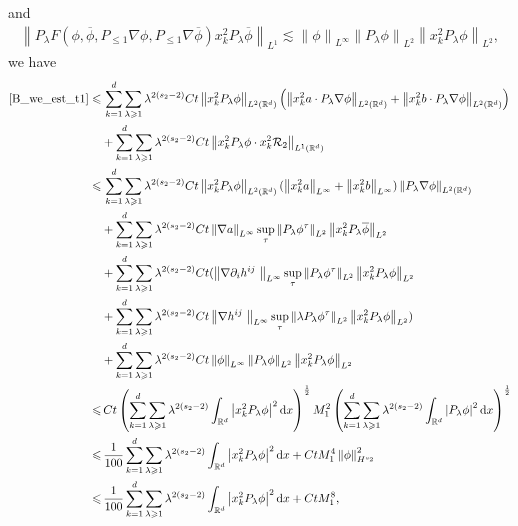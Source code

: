 \documentclass[10pt,twoside,a4paper]{article}
\numberwithin{equation}{section}\allowdisplaybreaks
\def\leq{\leqslant}
\def\geq{\geqslant}
\begin{document}
	and 
	\begin{align*}
		\left\|P_{\lambda}  F(\phi, \overline{\phi}, P_{\leq 1} \nabla \phi,  P_{\leq 1} \nabla \overline{\phi}) x^2_k P_{\lambda} \overline{ \phi } \right\|_{L^1}\lesssim \left\|\phi \right\|_{L^\infty} \left\|P_\lambda  \phi   \right\|_{L^2}
		\left\|x^2_k P_{\lambda} \phi \right\|_{L^2},
	\end{align*}
	we have
	\begin{align*} 
		\eqref{B_we_est_t1} \leq & \, \sum_{k=1}^d\sum_{\lambda\geq 1} \lambda^{2(s_2-2)}  C t    \left\| x_k^2 P_{\lambda}\phi\right\|_{L^{2}(\mathbb{R}^d)}  \left(\left\| x_k^2  a\cdot  P_{\lambda}  \nabla \phi \right\|_{L^{2}(\mathbb{R}^d)} + \left\|x_k^2  b\cdot  P_{\lambda}  \nabla \phi \right\|_{L^{2}(\mathbb{R}^d)}\right) \\
		&+ \sum_{k=1}^d\sum_{\lambda\geq 1} \lambda^{2(s_2-2)} C t\left\|x_k^2 P_{\lambda}\phi \cdot 
		x_k^2  \mathcal{R}_2\right\|_{L^{1}(\mathbb{R}^d)}\\
		\leq &  \, \sum_{k=1}^d\sum_{\lambda\geq 1} \lambda^{2(s_2-2)}  C t    \left\| x_k^2 P_{\lambda}\phi\right\|_{L^{2}(\mathbb{R}^d)} ( \left\| x_k^2 a \right\|_{L^\infty } + \left\| x_k^2 b \right\|_{L^\infty } )\left\| P_{\lambda}  \nabla \phi \right\|_{L^{2}(\mathbb{R}^d)}  \nonumber\\
		&+ \sum_{k=1}^d\sum_{\lambda\geq 1} \lambda^{2(s_2-2)} Ct   \left\|\nabla a\right\|_{L^\infty} \sup_\tau\left\| P_\lambda \phi^{\tau}\right\|_{L^2}  \left\|x^2_k P_{\lambda} \overline{ \phi }  \right\|_{L^2}\\
		&+ \sum_{k=1}^d\sum_{\lambda\geq 1} \lambda^{2(s_2-2)} Ct( \left\|\nabla \partial_ih^{ij}\ \right\|_{L^\infty}  \sup_{\tau} \left\|P_{\lambda}  \phi^\tau \right\|_{L^2} \left\|x^2_k P_{\lambda} \phi \right\|_{L^2}\\
		&+ \sum_{k=1}^d\sum_{\lambda\geq 1} \lambda^{2(s_2-2)} Ct\left\|\nabla  h^{ij}\ \right\|_{L^\infty}  \sup_{\tau} \left\| \lambda P_{\lambda}  \phi^\tau \right\|_{L^2} \left\|x^2_k P_{\lambda} \phi \right\|_{L^2})\\
		&+ \sum_{k=1}^d\sum_{\lambda\geq 1} \lambda^{2(s_2-2)} Ct \left\|\phi \right\|_{L^\infty} \left\|P_\lambda  \phi   \right\|_{L^2}
		\left\|x^2_k P_{\lambda} \phi \right\|_{L^2}\\
		\leq& \,  Ct\left( \sum_{k=1}^d\sum_{\lambda\geq 1} \lambda^{2(s_2-2)} \int_{\mathbb{R}^{d}} \left| x_k^2P_{\lambda}\phi\right|^2 \mathrm{d} x \right)^{\frac 12}  M_1^2\left(\sum_{k=1}^d\sum_{\lambda\geq 1} \lambda^{2(s_2-2)} \int_{\mathbb{R}^{d}} \left| P_{\lambda}\phi\right|^2 \mathrm{d} x \right)^{\frac 12}\\
		\leq &\, \frac{1}{100}   \sum_{k=1}^d\sum_{\lambda\geq 1} \lambda^{2(s_2-2)} \int_{\mathbb{R}^{d}} \left| x_k^2P_{\lambda}\phi\right|^2 \mathrm{d} x+ Ct  M_1^4    \left\|\phi\right\|_{H^{s_2}}^2\\
		\leq &\, \frac{1}{100}   \sum_{k=1}^d\sum_{\lambda\geq 1} \lambda^{2(s_2-2)} \int_{\mathbb{R}^{d}} \left| x_k^2P_{\lambda}\phi\right|^2 \mathrm{d} x+Ct M_1^8,
	\end{align*}
\end{document}
